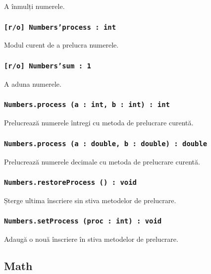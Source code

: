 A înmulți numerele.

\subsubsection{\texttt{[r/o] Numbers'process : int}}

Modul curent de a prelucra numerele.

\subsubsection{\texttt{[r/o] Numbers'sum : 1}}

A aduna numerele.

\subsubsection{\texttt{Numbers.process (a : int, b : int) : int}}

Prelucrează numerele întregi cu metoda de prelucrare curentă.

\subsubsection{\texttt{Numbers.process (a : double, b : double) : double}}

Prelucrează numerele decimale cu metoda de prelucrare curentă.

\subsubsection{\texttt{Numbers.restoreProcess () : void}}

Șterge ultima înscriere sin stiva metodelor de prelucrare.

\subsubsection{\texttt{Numbers.setProcess (proc : int) : void}}

Adaugă o nouă înscriere în stiva metodelor de prelucrare.

\subsection{Math}

